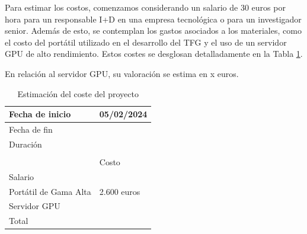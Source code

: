 Para estimar los costos, comenzamos considerando un salario de 30 euros por hora para un responsable I+D en una empresa tecnológica o para un investigador senior. Además de esto, se contemplan los gastos asociados a los materiales, como el costo del portátil utilizado en el desarrollo del TFG y el uso de un servidor GPU de alto rendimiento. Estos costes se desglosan detalladamente en la Tabla \ref{tab:coste-proyecto}. 

En relación al servidor GPU, su valoración se estima en x euros.

\begin{table}[]
	\centering
	\begin{tabular}{ll}
	\hline
	\multicolumn{1}{|l|}{\cellcolor[HTML]{FFCB2F}Fecha de inicio} & \multicolumn{1}{l|}{05/02/2024} \\ \hline
	\multicolumn{1}{|l|}{\cellcolor[HTML]{FFCB2F}Fecha de fin} & \multicolumn{1}{l|}{} \\ \hline
	\multicolumn{1}{|l|}{\cellcolor[HTML]{FFCB2F}Duración} & \multicolumn{1}{l|}{} \\ \hline
	 &  \\ \hline
	\rowcolor[HTML]{FFCB2F} 
	\multicolumn{1}{|l|}{\cellcolor[HTML]{FFCB2F}Item} & \multicolumn{1}{l|}{\cellcolor[HTML]{FFCB2F}Costo} \\ \hline
	\multicolumn{1}{|l|}{Salario} & \multicolumn{1}{l|}{} \\ \hline
	\multicolumn{1}{|l|}{Portátil de Gama Alta} & \multicolumn{1}{l|}{2.600 euros} \\ \hline
	\multicolumn{1}{|l|}{Servidor GPU} & \multicolumn{1}{l|}{} \\ \hline
	\multicolumn{1}{|l|}{\cellcolor[HTML]{FFCB2F}Total} & \multicolumn{1}{l|}{} \\ \hline
	\end{tabular}
	\caption{Estimación del coste del proyecto}
	\label{tab:coste-proyecto}
\end{table}